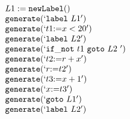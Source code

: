 \documentclass{jarticle}
\begin{document}
\[
 \begin{array}{l}
    L1:=\makenewlabel\\
    \genlabel{L1}\\
    \genassign{t1}{x<20}\\
    \genlabel{L2}\\
    \genifnot{t1}{L2}\\
    \genassign{t2}{r+x}\\
    \genassign{r}{t2}\\
    \genassign{t3}{x+1}\\
    \genassign{x}{t3}\\
    \gengoto{L1}\\
    \genlabel{L2}
 \end{array}
\]
\end{document}
